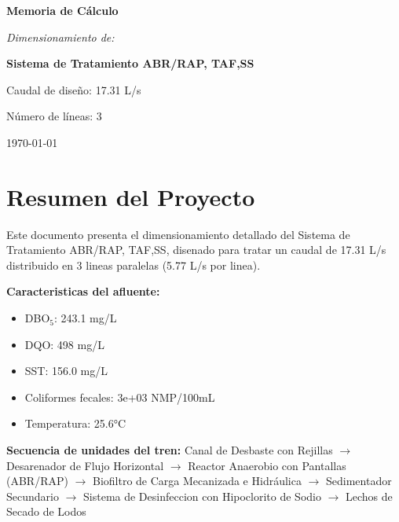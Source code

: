\documentclass[12pt,a4paper]{article}
\begin{document}
\begin{titlepage}
\centering
\vspace*{2cm}

{\Huge\bfseries Memoria de Cálculo\par}
\vspace{1.5cm}

{\Large\itshape Dimensionamiento de:\par}
\vspace{0.5cm}

{\LARGE\bfseries Sistema de Tratamiento ABR/RAP, TAF,SS\par}
\vspace{2cm}

{\large Caudal de diseño: 17.31 L/s\par}
{\large Número de líneas: 3\par}
\vfill
{\large\today\par}
\end{titlepage}

\tableofcontents

\listoffigures

\listoftables

\newpage
\section{Resumen del Proyecto}

Este documento presenta el dimensionamiento detallado del Sistema de Tratamiento ABR/RAP, TAF,SS, disenado para tratar un caudal de 17.31 L/s distribuido en 3 lineas paralelas (5.77 L/s por linea).

\textbf{Caracteristicas del afluente:}
\begin{itemize}
    \item DBO$_5$: 243.1 mg/L
    \item DQO: 498 mg/L
    \item SST: 156.0 mg/L
    \item Coliformes fecales: 3e+03 NMP/100mL
    \item Temperatura: 25.6°C
\end{itemize}

\textbf{Secuencia de unidades del tren:} 
Canal de Desbaste con Rejillas $\rightarrow$ Desarenador de Flujo Horizontal $\rightarrow$ Reactor Anaerobio con Pantallas (ABR/RAP) $\rightarrow$ Biofiltro de Carga Mecanizada e Hidráulica $\rightarrow$ Sedimentador Secundario $\rightarrow$ Sistema de Desinfeccion con Hipoclorito de Sodio $\rightarrow$ Lechos de Secado de Lodos
\end{document}
